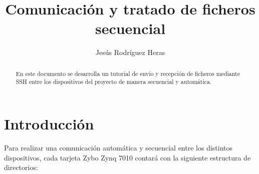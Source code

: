 \documentclass[12pt,letterpaper]{article}
\title{Comunicación y tratado de ficheros secuencial}
\author{Jesús Rodríguez Heras}
\begin{document}
	
	\maketitle
	\begin{abstract} %
		\begin{center}
			En este documento se desarrolla un tutorial de envío y recepción de ficheros mediante SSH entre los dispositivos del proyecto de manera secuencial y automática.
		\end{center}
	\end{abstract}
	\thispagestyle{empty}
	\newpage
	
	\tableofcontents
	\newpage
	
	
	
	
	\lstset{language=bash, numbers=left, numberstyle=\tiny, numbersep=10pt, firstnumber=1, stepnumber=1, basicstyle=\small\ttfamily, tabsize=1, extendedchars=true, inputencoding=utf8/latin1, breaklines=true}
	

\section{Introducción}
Para realizar una comunicación automática y secuencial entre los distintos dispositivos, cada tarjeta Zybo Zynq 7010 contará con la siguiente estructura de directorios:\\
\end{document}
